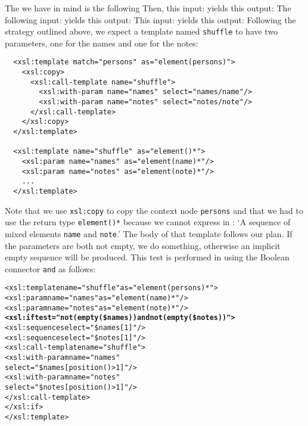 The \DTD we have in mind is the following
\noindent Then, this input:
\noindent yields this output:
\noindent The following input:
\noindent yields this output:
\noindent This input:
\noindent yields this output:
Following the strategy outlined above, we expect a template named
\texttt{shuffle} to have two parameters, one for the names and one for
the notes:
\begin{verbatim}
  <xsl:template match="persons" as="element(persons)">
    <xsl:copy>
      <xsl:call-template name="shuffle">
        <xsl:with-param name="names" select="names/name"/>
        <xsl:with-param name="notes" select="notes/note"/>
      </xsl:call-template>
    </xsl:copy>
  </xsl:template>

  <xsl:template name="shuffle" as="element()*">
    <xsl:param name="names" as="element(name)*"/>
    <xsl:param name="notes" as="element(note)*"/>
    ...
  </xsl:template>
\end{verbatim}
Note that we use \texttt{xsl:copy} to copy the context node
\texttt{persons} and that we had to use the return type
\texttt{element()*} because we cannot express in \XPath: `A sequence
of mixed elements \texttt{name} and \texttt{note}.' The body of that
template follows our plan. If the parameters are both not empty, we do
something, otherwise an implicit empty sequence will be produced. This
test is performed in \XPath using the Boolean connector \texttt{and}
as follows:
\begin{alltt}
  <xsl:template name="shuffle" as="element(persons)*">
    <xsl:param name="names" as="element(name)*"/>
    <xsl:param name="notes" as="element(note)*"/>
    \textbf{<xsl:if test="not(empty(\$names)) and not(empty(\$notes))">}
      <xsl:sequence select="\$names[1]"/>
      <xsl:sequence select="\$notes[1]"/>
      <xsl:call-template name="shuffle">
        <xsl:with-param name="names"
                        select="\$names[position()>1]"/>
        <xsl:with-param name="notes"
                        select="\$notes[position()>1]"/>
      </xsl:call-template>
    </xsl:if>
  </xsl:template>
\end{alltt}

